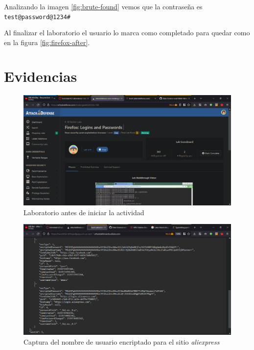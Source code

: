 \documentclass{article}
\begin{document}
            Analizando la imagen \ref{fig:brute-found} vemos que la contraseña es \texttt{test@password@1234\#}
            
    Al finalizar el laboratorio el usuario lo marca como completado para quedar como en la figura \ref{fig:firefox-after}.

    
    

    \clearpage
    \appendix
    \section{Evidencias}

        \begin{landscape}
            \begin{figure}[!h]
                \centering
                \includegraphics[scale=0.5]{img/firefox-evidence-before.png}
                \caption{Laboratorio antes de iniciar la actividad}
                \label{fig:firefox-before}
            \end{figure}
        \end{landscape}

        \begin{figure}[!h]
            \centering
            \includegraphics[scale=0.35]{img/aliexpress-username.png}
            \caption{Captura del nombre de usuario encriptado para el sitio \emph{aliexpress}}
            \label{fig:encrypted-ali}
        \end{figure}
\end{document}
